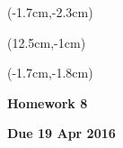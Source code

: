 \documentclass[12pt, oneside]{article}
\begin{document}


\begin{textblock*}{4cm}(-1.7cm,-2.3cm)
\end{textblock*}

\begin{textblock*}{8cm}(12.5cm,-1cm)
\end{textblock*}
\begin{textblock*}{13.5cm}(-1.7cm,-1.8cm)
\end{textblock*}

\vspace{1cm}

\begin{center}
\textbf{\Large Homework 8}

\textbf{Due 19 Apr 2016}
\end{center}
\end{document}
